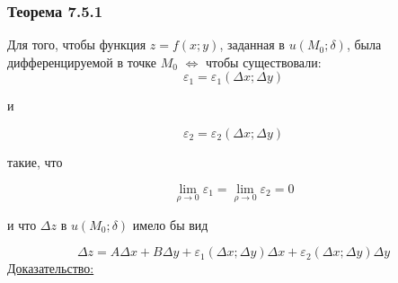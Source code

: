 \documentclass[12pt]{article}
\begin{document}
    \subsubsection*{Теорема 7.5.1}\label{th:7.5.1}
    Для того, чтобы функция $z = f(x;y)$, заданная в $u(M_0; \delta)$, была дифференцируемой в точке $M_0$ $\Longleftrightarrow$ чтобы существовали: 
    \[\varepsilon_1 = \varepsilon_1(\Delta x; \Delta y)\]
    \begin{center}
        и
    \end{center}
    \[\varepsilon_2 = \varepsilon_2 (\Delta x; \Delta y)\] 
    \begin{center}
        такие, что
    \end{center}
    \[\lim_{\rho \to 0}\varepsilon_1 = \lim_{\rho \to 0}\varepsilon_2 = 0\]
    \begin{center}
        и что $\Delta z$ в $u(M_0; \delta)$ имело бы вид
    \end{center}
    \[ \Delta z = A \Delta x + B \Delta y + \varepsilon_1 (\Delta x; \Delta y)\Delta x + \varepsilon_2 (\Delta x; \Delta y)\Delta y \]
    \noindent\underline{Доказательство:}
\end{document}
